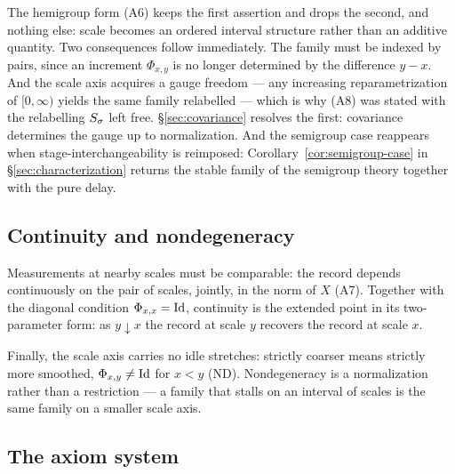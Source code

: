 The hemigroup form (A6) keeps the first assertion and drops the second, and nothing else:
scale becomes an ordered interval structure rather than an additive quantity. Two
consequences follow immediately. The family must be indexed by pairs, since an increment
$\Phi_{x,y}$ is no longer determined by the difference $y - x$. And the scale axis
acquires a gauge freedom --- any increasing reparametrization of $[0,\infty)$ yields the
same family relabelled --- which is why (A8) was stated with the relabelling
$S_\sigma$ left free. \S\ref{sec:covariance} resolves the first: covariance
determines the gauge up to normalization. And the semigroup case reappears when
stage-interchangeability is reimposed: Corollary~\ref{cor:semigroup-case} in
\S\ref{sec:characterization} returns the stable family of the semigroup theory together
with the pure delay.

\subsection{Continuity and nondegeneracy}\label{sec:measurement-continuity}

Measurements at nearby scales must be comparable: the record depends continuously on the
pair of scales, jointly, in the norm of $X$ (A7). Together with the diagonal condition
$\Phi_{x,x} = \mathrm{Id}$, continuity is the extended point in its two-parameter form: as
$y \downarrow x$ the record at scale $y$ recovers the record at scale $x$.

Finally, the scale axis carries no idle stretches: strictly coarser means strictly more
smoothed, $\Phi_{x,y} \ne \mathrm{Id}$ for $x < y$ (ND). Nondegeneracy is a normalization rather
than a restriction --- a family that stalls on an interval of scales is the same family
on a smaller scale axis.

\subsection{The axiom system}\label{sec:measurement-axioms}

